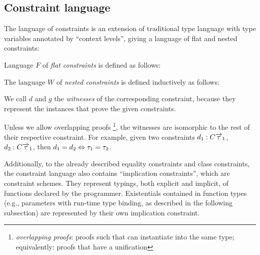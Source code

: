 \subsection{Constraint language}

The language of constraints is an extension of traditional type language with type variables annotated by ``context levels'', giving a language of flat and nested constraints:

\begin{defn}
    \label{def:defer_constr}

    Language $F$ of \emph{flat constraints} is defined as follows:

    \begin{center}\begin{grammar}
    \end{grammar}\end{center}

    The language $W$ of \emph{nested constraints} is defined inductively as follows:

    \begin{center}\begin{grammar}
    \end{grammar}\end{center}

    \label{constraint_language}
\end{defn}

We call $d$ and $g$ the \emph{witnesses} of the corresponding constraint, because they represent the instances that prove the given constraints.

Unless we allow overlapping proofs \footnote{\emph{overlapping proofs}: proofs such that can instantiate into the same type; equivalently: proofs that have a unification}, the witnesses are isomorphic to the rest of their respective constraint. For example, given two constraints $d_1: C \overrightarrow{\tau}_1$, $d_2: C \overrightarrow{\tau}_1$, then $d_1 = d_2 \Leftrightarrow \tau_1 = \tau_2$.

Additionally, to the already described equality constraints and class constraints, the constraint language also contains ``implication constraints'', which are constraint schemes. They represent typings, both explicit and implicit, of functions declared by the programmer. Existentials contained in function types (e.g., parameters with run-time type binding, as described in the following subsection) are represented by their own implication constraint.

